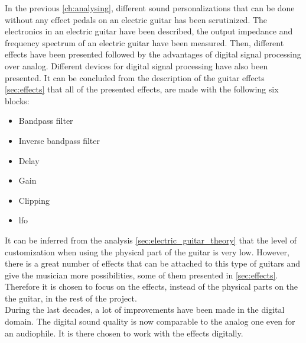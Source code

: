 In the previous \autoref{ch:analysing}, different sound personalizations that can be done without any effect pedals on an electric guitar has been scrutinized. The electronics in an electric guitar have been described, the output impedance and frequency spectrum of an electric guitar have been measured. Then, different effects have been presented followed by the advantages of digital signal processing over analog. Different devices for digital signal processing have also been presented. It can be concluded from the description of the guitar effects \autoref{sec:effects} that all of the presented effects, are made with the following six blocks:
\begin{itemize}
\item Bandpass filter
\item Inverse bandpass filter
\item Delay
\item Gain
\item Clipping
\item \gls{lfo}
\end{itemize}
It can be inferred from the analysis \autoref{sec:electric_guitar_theory} that the level of customization when using the physical part of the guitar is very low. However, there is a great number of effects that can be attached to this type of guitars and give the musician more possibilities, some of them presented in \autoref{sec:effects}. Therefore it is chosen to focus on the effects, instead of the physical parts on the the guitar, in the rest of the project.  \\
During the last decades, a lot of improvements have been made in the digital domain. The digital sound quality is now comparable to the analog one even for an audiophile. It is there chosen to work with the effects digitally.
